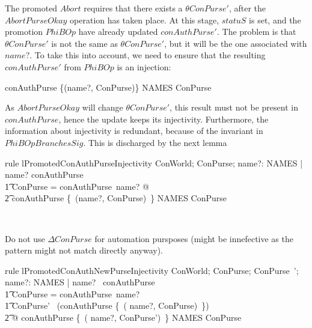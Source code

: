The promoted $Abort$ requires that there exists a $\theta ConPurse'$, after
the $AbortPurseOkay$ operation has taken place. At this stage, $statuS$ is set, and the
promotion $PhiBOp$ have already updated $conAuthPurse'$. The problem is that $\theta ConPurse'$
is not the same as $\theta ConPurse'$, but it will be the one associated with $name?$.
To take this into account, we need to ensure that the resulting $conAuthPurse'$ from $PhiBOp$
is an injection:
%
\begin{gzed}
    conAuthPurse \oplus \{(name?, \theta ConPurse)\} \in NAMES \pinj ConPurse
\end{gzed}
%
As $AbortPurseOkay$ will change $\theta ConPurse'$, this result must not
be present in $conAuthPurse$, hence the update keeps its injectivity.
Furthermore, the information about injectivity is redundant, because of the invariant in $PhiBOpBranchesSig$.
This is discharged by the next lemma
%
\begin{LNewLemma}
\begin{theorem}{rule lPromotedConAuthPurseInjectivity}
    \forall ConWorld; ConPurse; name?: NAMES | name? \in \dom conAuthPurse \\
        \t1 \land \theta ConPurse = conAuthPurse~name? @ \\
            \t2 conAuthPurse \oplus \{~(name?, \theta ConPurse)~\} \in NAMES \pinj ConPurse
\end{theorem}~\end{LNewLemma}
%
Do not use $\Delta ConPurse$ for automation pursposes (might be innefective as the pattern might not match directly anyway).
%
\begin{LNewLemma}
\begin{theorem}{rule lPromotedConAuthNewPurseInjectivity}
  \forall ConWorld; ConPurse; ConPurse~'; name?: NAMES | name? \in \dom~conAuthPurse \\
        \t1 \land \theta ConPurse =  conAuthPurse~name? \\
        \t1 \land \lnot \theta ConPurse' \in \ran~(conAuthPurse \oplus \{~( name?, \theta ConPurse)~\}) \\
            \t2 @ conAuthPurse \oplus \{~( name?, \theta ConPurse')~\} \in  NAMES \finj ConPurse
\end{theorem}~\end{LNewLemma}


